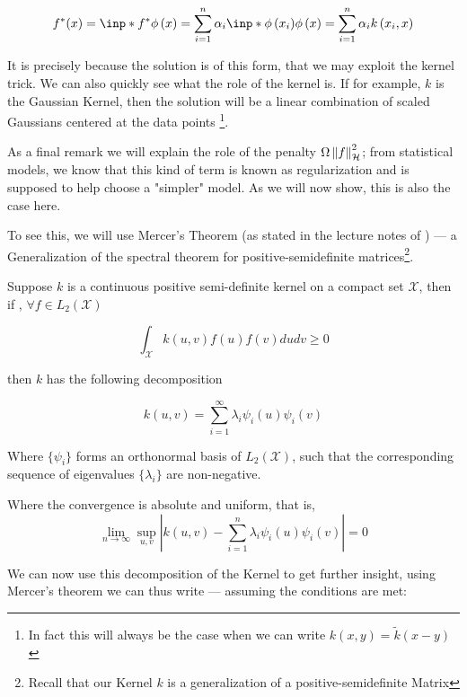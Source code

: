 $$
    f^{*}(x) = \inp*{f^{*}}{\phi\left(x\right)} = 
    \sum_{i=1}^{n} \alpha_{i} \inp*{\phi\left(x_i\right)}{\phi\left(x\right)} =
    \sum_{i=1}^{n} \alpha_{i} k\left(x_i, x\right)
$$

It is precisely because the solution is of this form, that we may exploit the kernel trick. We can
also quickly see what the role of the kernel is. If for example, $k$ is the Gaussian Kernel, then
the solution will be a linear combination of scaled Gaussians centered at the data points
\footnote{In fact this will always be the case when we can write $k\left(x, y\right) = \tilde{k}\left(x - y\right)$}. 

As a final remark we will explain the role of the penalty $\Omega \left\lVert f\right\rVert_{\mathcal{H}}^{2}$; from 
statistical models, we know that this kind of term is known as regularization and is supposed to help 
choose a "simpler" model. As we will now show, this is also the case here.

To see this, we will use Mercer's Theorem (as stated in the lecture notes of \cite{BartlettNotes}) --- a Generalization of the spectral theorem for positive-semidefinite
matrices\footnote{Recall that our Kernel $k$ is a generalization of a positive-semidefinite Matrix}.

\begin{theorem}[Mercer's] 

Suppose $k$ is a continuous positive semi-definite kernel on a compact set $\mathcal{X}$, then if
, $\forall f \in L_{2}(\mathcal{X})$

\[
\int_{\mathcal{X}} k(u, v) f(u) f(v) d u d v \geq 0
\]

then $k$ has the following decomposition

\begin{equation}
    k(u, v)=\sum_{i=1}^{\infty} \lambda_{i} \psi_{i}(u) \psi_{i}(v)
\end{equation}

Where $\{\psi_i\}$ forms an orthonormal basis of $L_2(\mathcal{X})$, 
such that the corresponding sequence of eigenvalues $\{\lambda_i\}$ are non-negative.

Where the convergence is absolute and uniform, that is,
\[
\lim _{n \rightarrow \infty} \sup _{u, v}\left|k(u, v)-\sum_{i=1}^{n} \lambda_{i} \psi_{i}(u) \psi_{i}(v)\right|=0
\]
    
\end{theorem}

We can now use this decomposition of the Kernel to get further insight, using Mercer's theorem we can 
thus write --- assuming the conditions are met:

